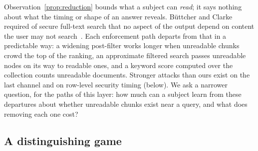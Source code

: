 
Observation~\ref{prop:reduction} bounds what a subject can \emph{read}; it says nothing about what the timing
or shape of an answer reveals. B\"{u}ttcher and Clarke required of secure full-text search that no aspect of the
output depend on content the user may not search~\cite{buttcher2005security}. Each enforcement path departs from that
in a predictable way: a widening post-filter works longer when unreadable chunks crowd the top of the ranking, an
approximate filtered search passes unreadable nodes on its way to readable ones, and a keyword score computed over the
collection counts unreadable documents. Stronger attacks than ours exist on the last channel and on row-level security
timing (below). We ask a narrower question, for the paths of this layer: how
much can a subject learn from these departures about whether unreadable chunks exist near a query, and what does removing each one cost?

\subsection{A distinguishing game}\label{sec:side-game}

